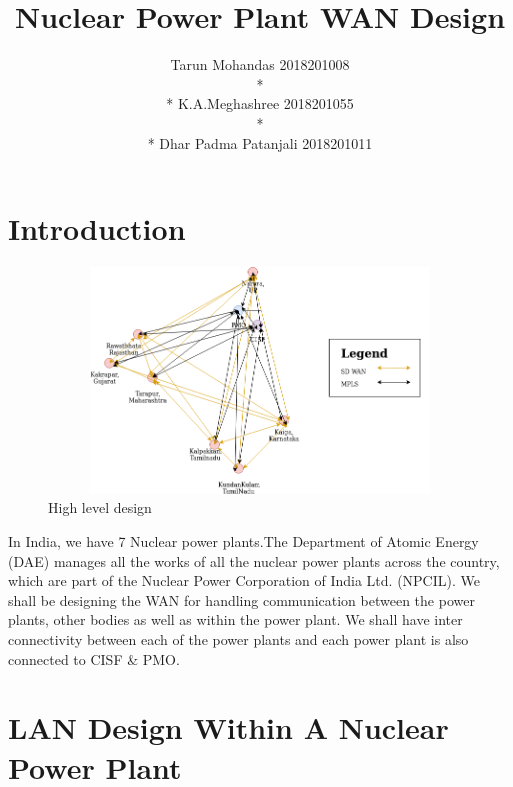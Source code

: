 \documentclass{article}
\title{Nuclear Power Plant WAN Design}
\author{Tarun Mohandas  2018201008 \\* \\* K.A.Meghashree  2018201055 \\* \\* Dhar Padma Patanjali  2018201011}
\date{}
\begin{document}
\maketitle

\section{Introduction}
\begin{figure}[htb]
	\centering
	\includegraphics[width=12cm,height=6cm]{ass1.png}
	\caption{High level design}
\end{figure}
In India, we have 7 Nuclear power plants.The Department of Atomic Energy (DAE) manages all the works of all the
nuclear power plants across the country, which are part of the Nuclear Power Corporation of India Ltd. (NPCIL). We shall be designing the WAN for handling communication between the power plants, other bodies as well as within the power plant. We shall have inter connectivity between each of the power plants and each power plant is also connected to CISF \& PMO.
\section{LAN Design Within A Nuclear Power Plant}
\end{document}
